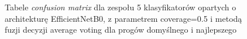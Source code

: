 \documentclass[polish,12pt]{aghthesis}
\begin{document}
\begin{figure}[H]
    \begin{adjustbox}{minipage=1.0\paperwidth, pagecenter}
    \centering
    \qquad
    \end{adjustbox}
    \label{fig:eff-ens-5-0.5-avg-thresh-matrices}
    \caption{Tabele \textit{confusion matrix} dla zespołu 5 klasyfikatorów opartych o architekturę EfficientNetB0, z parametrem coverage=0.5 i metodą fuzji decyzji average voting dla progów domyślnego i najlepszego}
\end{figure}
\end{document}
